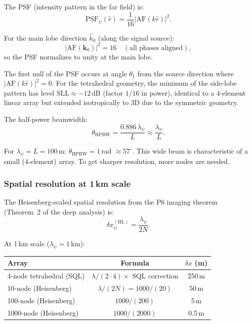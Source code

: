 \documentclass[11pt]{article}
\theoremstyle{definition}
\theoremstyle{remark}
\newcommand{\HL}{\mathrm{HL}}
\begin{document}
The PSF (intensity pattern in the far field) is:
\begin{equation}
\mathrm{PSF}_\psi(\hat{r}) = \frac{1}{16}\left|\mathrm{AF}(k\hat{r})\right|^2.
\end{equation}

For the main lobe direction $\hat{k}_0$ (along the signal source):
\begin{equation}
|\mathrm{AF}(\mathbf{k}_0)|^2 = 16 \quad (\text{all phases aligned}),
\end{equation}
so the PSF normalizes to unity at the main lobe.

The first null of the PSF occurs at angle $\theta_1$ from the source
direction where $|\mathrm{AF}(k\hat{r})|^2 = 0$. For the tetrahedral
geometry, the minimum of the side-lobe pattern has level
$\mathrm{SLL} \approx -12$\,dB (factor $1/16$ in power), identical to
a 4-element linear array but extended isotropically to 3D due to the
symmetric geometry.

The half-power beamwidth:
\begin{equation}
\theta_{\mathrm{HPBW}} = \frac{0.886\,\lambda_\psi}{L}
\approx \frac{\lambda_\psi}{L}.
\label{eq:tet-hpbw}
\end{equation}

For $\lambda_\psi = L = 100$\,m: $\theta_{\mathrm{HPBW}} = 1$\,rad $\approx 57^\circ$.
This wide beam is characteristic of a small (4-element) array. To get
sharper resolution, more nodes are needed.

\subsubsection{Spatial resolution at 1\,km scale}

The Heisenberg-scaled spatial resolution from the P6 imaging theorem
(Theorem~2 of the deep analysis) is:
\begin{equation}
\delta x_\psi^{(\HL)} = \frac{\lambda_\psi}{2N}.
\label{eq:heisenberg-resolution}
\end{equation}

At 1\,km scale ($\lambda_\psi = 1$\,km):
\begin{center}
\begin{tabular}{lcc}
\toprule
Array & Formula & $\delta x$ (m) \\
\midrule
4-node tetrahedral (SQL) & $\lambda/(2\cdot 4) \times$ SQL correction & 250\,m \\
10-node (Heisenberg) & $\lambda/(2N) = 1000/(20)$ & 50\,m \\
100-node (Heisenberg) & $1000/(200)$ & 5\,m \\
1000-node (Heisenberg) & $1000/(2000)$ & 0.5\,m \\
\bottomrule
\end{tabular}
\end{center}
\end{document}

